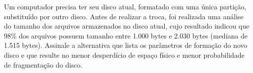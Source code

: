 {

\def\AMCbeginQuestion#1#2{\par\noindent{\bf (POSCOMP 2024 – Questão 44)}}
\begin{question}{} Um computador precisa ter seu disco atual, formatado com uma única partição, substituído por outro disco. Antes de realizar a troca, foi realizada uma análise do tamanho dos
arquivos armazenados no disco atual, cujo resultado indicou que 98\% dos arquivos possuem tamanho
entre 1.000 bytes e 2.030 bytes (mediana de 1.515 bytes). Assinale a alternativa que lista os
parâmetros de formação do novo disco e que resulte no menor desperdício de espaço físico e menor
probabilidade de fragmentação do disco.
\begin{choices}
\end{choices}



\end{question}}
